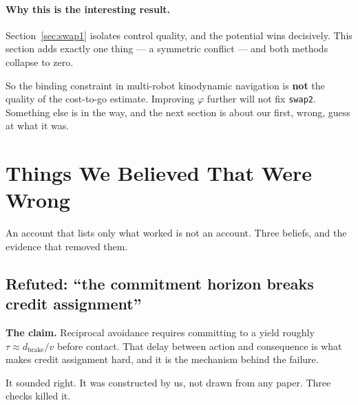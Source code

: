 \documentclass[11pt,a4paper]{article}
\newcommand{\code}[1]{\texttt{\small #1}}
\begin{document}
\paragraph{Why this is the interesting result.} Section~\ref{sec:swap1} isolates control
quality, and the potential wins decisively. This section adds exactly one thing --- a
symmetric conflict --- and both methods collapse to zero.

So the binding constraint in multi-robot kinodynamic navigation is \textbf{not} the quality
of the cost-to-go estimate. Improving $\varphi$ further will not fix \code{swap2}. Something
else is in the way, and the next section is about our first, wrong, guess at what it was.

\section{Things We Believed That Were Wrong}
\label{sec:refuted}

An account that lists only what worked is not an account. Three beliefs, and the evidence
that removed them.

\subsection{Refuted: ``the commitment horizon breaks credit assignment''}

\textbf{The claim.} Reciprocal avoidance requires committing to a yield roughly
$\tau \approx d_{\text{brake}}/v$ before contact. That delay between action and consequence
is what makes credit assignment hard, and it is the mechanism behind the failure.

It sounded right. It was constructed by us, not drawn from any paper. Three checks killed
it.
\end{document}
